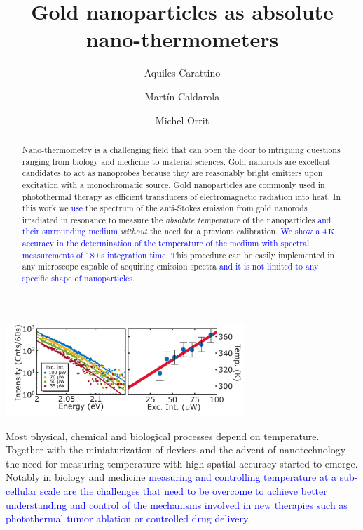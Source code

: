 \documentclass[journal=nalefd,manuscript=letter]{achemso}
\author{Aquiles Carattino}
\affiliation[Leiden]
{Huygens-Kamerlingh Onnes Lab, 2300RA Leiden, The Netherlands}
\author{Mart\'in Caldarola}
\affiliation[Leiden]
{Huygens-Kamerlingh Onnes Lab, 2300RA Leiden, The Netherlands}
\author{Michel Orrit}
\affiliation[Leiden]
{Huygens-Kamerlingh Onnes Lab, 2300RA Leiden, The Netherlands}
\title{Gold nanoparticles as absolute nano-thermometers}
\newcommand{\HI}[1]{\textcolor{blue}{#1}} %
\newcommand{\K}{\ensuremath{\,\textrm{K}}}
\begin{document}

\begin{tocentry}

\includegraphics[width=90.0mm]{Figures/00_TOC/TOC.png}

\end{tocentry}

\begin{abstract}
Nano-thermometry is a challenging field that can open the door
to intriguing questions ranging from biology and medicine to material sciences.
Gold nanorods are excellent candidates to act as nanoprobes because they are
reasonably bright emitters upon excitation with a monochromatic source.
Gold nanoparticles are commonly used in photothermal therapy as efficient
transducers of electromagnetic radiation into heat. In this work we \HI{use} 
the spectrum of the anti-Stokes emission from gold nanorods irradiated in
resonance to measure the \textit{absolute temperature} of the nanoparticles \HI{and their
surrounding medium} \textit{without} the need for a previous calibration. 
\HI{We show a $4\K$ accuracy in the determination
of the temperature of the medium with spectral measurements of $180$ s integration time.}
This procedure can be easily implemented in any microscope capable of acquiring emission spectra \HI{and it
is not limited to any specific shape of nanoparticles.} 

\end{abstract}


Most physical, chemical and biological processes depend on
temperature. Together with the miniaturization of devices and the advent of
nanotechnology the need for measuring temperature with high spatial accuracy
started to emerge. Notably in biology\cite{Yang2011a,Hrelescu2010} and
medicine\cite{Li2013c} \HI{measuring and controlling temperature at a sub-cellular 
scale are the challenges that need to be overcome to achieve better understanding and control 
of the mechanisms involved in new therapies such as photothermal tumor ablation\cite{Gobin2007} 
or controlled drug delivery\cite{Huang2006,Huo2014}.}
\end{document}
